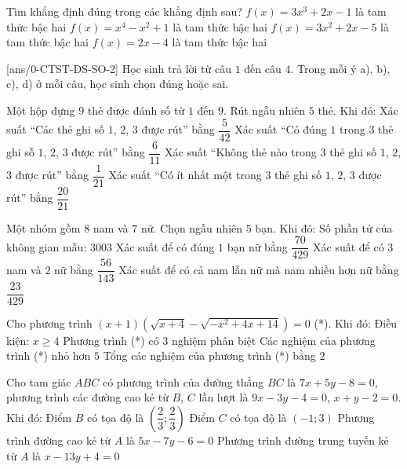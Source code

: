 \begin{ex}%
Tìm khẳng định đúng trong các khẳng định sau?
\choice
{$f(x)=3 x^3+2x-1$ là tam thức bậc hai}
{$f(x)=x^4-x^2+1$ là tam thức bậc hai}
{\True $f(x)=3x^2+2x-5$ là tam thức bậc hai}
{$f(x)=2x-4$ là tam thức bậc hai}
\loigiai{

}
\end{ex}



\cauds
{}[ans/0-CTST-DS-SO-2]
\setcounter{ex}{0}
Học sinh trả lời từ câu $1$ đến câu $4$. Trong mỗi ý a), b), c), d) ở mỗi câu, học sinh chọn đúng hoặc sai.
\begin{ex} %
Một hộp đựng $9$ thẻ được đánh số từ $1$ đến $9$. Rút ngẫu nhiên $5$ thẻ. Khi đó:
	\choiceTF
	{\True Xác suất ``Các thẻ ghi số $1$, $2$, $3$ được rút'' bằng $\dfrac{5}{42}$}
	{Xác suất ``Có đúng $1$ trong $3$ thẻ ghi sỗ $1$, $2$, $3$ được rút'' bằng $\dfrac{6}{11}$} %
	{\True Xác suất ``Không thẻ nào trong $3$ thẻ ghi số $1$, $2$, $3$ được rút'' bằng $\dfrac{1}{21}$}
	{\True Xác suất ``Có ít nhất một trong $3$ thẻ ghi số $1$, $2$, $3$ được rút'' bằng $\dfrac{20}{21}$}
	\loigiai{
		
	}
\end{ex}

\begin{ex}%
Một nhóm gồm $8$ nam và $7$ nữ. Chọn ngẫu nhiên $5$ bạn. Khi đó:
	\choiceTF
	{\True Số phần tử của không gian mẫu: $3003$}
	{\True Xác suất để có đúng $1$ bạn nữ bằng $\dfrac{70}{429}$}
	{\True Xác suất để có $3$ nam và $2$ nữ bằng $\dfrac{56}{143}$}
	{Xác suất để có cả nam lẫn nữ mà nam nhiều hơn nữ bằng $\dfrac{23}{429}$} %
	\loigiai{
	
	}
\end{ex}

\begin{ex}%
Cho phương trình $(x+1)\left(\sqrt{x+4}-\sqrt{-x^2+4 x+14}\right)=0$ (*). Khi đó:
	\choiceTF
	{Điều kiện: $x \geq 4$}
	{\True Phương trình (*) có $3$ nghiệm phân biệt}
	{Các nghiệm của phương trình (*) nhỏ hơn $5$}
	{\True Tổng các nghiệm của phương trình (*) bằng $2$}
	\loigiai{
		
	}
\end{ex}

\begin{ex}%
Cho tam giác $ABC$ có phương trình của đường thẳng $BC$ là $7x+5y-8=0$, phương trình các đường cao kẻ từ $B$, $C$ lần lượt là $9x-3y-4=0$, $x+y-2=0$. Khi đó:
	\choiceTF
	{\True Điểm $B$ có tọa độ là $\left(\dfrac{2}{3};\dfrac{2}{3}\right)$}
	{\True Điểm $C$ có tọa độ là $(-1;3)$}
	{Phương trình đường cao kẻ từ $A$ là $5x-7y-6=0$} %
	{Phương trình đường trung tuyến kẻ từ $A$ là $x-13y+4=0$}
	\loigiai{
	
	}
\end{ex}

